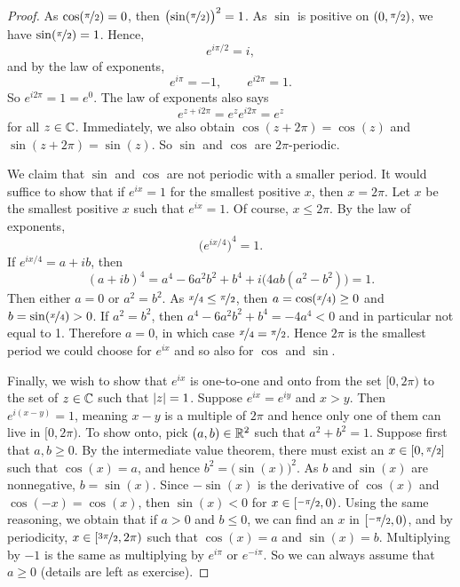 \begin{proof}
As $\cos(\nicefrac{\pi}{2}) = 0$, then
${\bigl(\sin(\nicefrac{\pi}{2})\bigr)}^2 = 1$.
As $\sin$ is positive on $(0,\nicefrac{\pi}{2})$, we have
$\sin(\nicefrac{\pi}{2}) = 1$.
Hence,
\begin{equation*}
e^{i \pi /2} = i ,
\end{equation*}
and by the law of exponents,
\begin{equation*}
e^{i \pi} = -1 ,
\qquad 
e^{i 2\pi} = 1 .
\end{equation*}
So $e^{i2\pi} = 1 = e^0$.  The law of exponents also says
\begin{equation*}
e^{z+i2\pi} = e^z e^{i2\pi} = e^z
\end{equation*}
for all $z \in {\mathbb{C}}$.  Immediately, we also obtain
$\cos(z+2\pi) = \cos(z)$ and $\sin(z+2\pi) = \sin(z)$.
So $\sin$ and $\cos$ are $2\pi$-periodic.

We claim that $\sin$ and $\cos$ are not periodic with a smaller period.  It
would suffice to show that if $e^{ix} = 1$ for the
smallest positive $x$, then
$x = 2\pi$.  Let $x$ be the smallest positive $x$ such that
$e^{ix} = 1$.
Of course, $x \leq 2\pi$.
By the law of exponents,
\begin{equation*}
{\bigl(e^{ix/4}\bigr)}^4 = 1 .
\end{equation*}
If $e^{ix/4} = a+ib$, then
\begin{equation*}
{(a+ib)}^4
=a^4-6a^2b^2+b^4 + i\bigl(4ab(a^2-b^2)\bigr)
=1 .
\end{equation*}
Then either $a = 0$ or $a^2 = b^2$.
As $\nicefrac{x}{4} \leq \nicefrac{\pi}{2}$, then $a = \cos(\nicefrac{x}{4}) \geq 0$ and
$b = \sin(\nicefrac{x}{4}) > 0$.
If $a^2=b^2$, then
$a^4-6a^2b^2+b^4 = -4a^4 < 0$ and in particular not equal to 1.
Therefore $a=0$, in which case $\nicefrac{x}{4} = \nicefrac{\pi}{2}$.
Hence $2\pi$ is the smallest period we could choose for $e^{ix}$
and so also for $\cos$ and $\sin$.

Finally, we wish to show that $e^{ix}$ is one-to-one and onto
from the set $[0,2\pi)$ to the set of $z \in {\mathbb{C}}$ such that
$\lvert {z} \rvert = 1$.  Suppose $e^{ix} = e^{iy}$ and 
$x > y$.  Then
$e^{i(x-y)} = 1$, meaning $x-y$ is a multiple of $2\pi$ and hence
only one of them can live in $[0,2\pi)$.
To show onto, pick $(a,b) \in {\mathbb{R}}^2$ such that $a^2+b^2 = 1$.
Suppose first that $a,b \geq 0$.  By the intermediate value theorem,
there must exist an $x \in [0,\nicefrac{\pi}{2}]$ such that
$\cos(x) = a$, and hence $b^2 = \bigl(\sin(x)\bigr)^2$.  As
$b$ and $\sin(x)$ are nonnegative, $b = \sin(x)$.
Since $-\sin(x)$ is the derivative of $\cos(x)$
and $\cos(-x) = \cos(x)$, then $\sin(x) < 0$ for $x \in [\nicefrac{-\pi}{2},0)$.
Using the same reasoning, we obtain that
if $a > 0$ and $b \leq 0$, we can find an $x$ in $[\nicefrac{-\pi}{2},0)$,
and by periodicity,
$x \in [\nicefrac{3\pi}{2},2\pi)$ such that $\cos(x) = a$ and $\sin(x)=b$.
Multiplying by $-1$ is the same as multiplying by $e^{i\pi}$ or
$e^{-i\pi}$.  So we can always assume that $a \geq 0$ (details are left
as exercise).
\end{proof}

